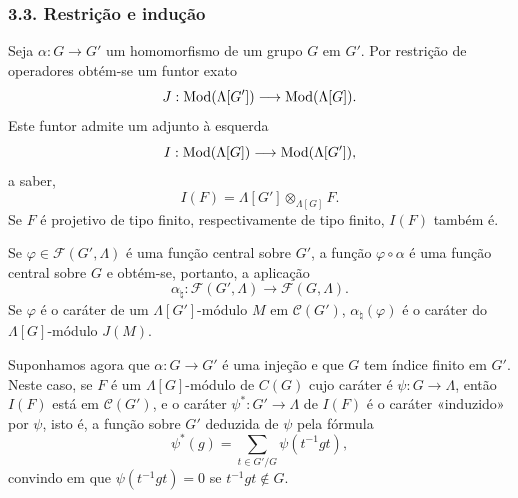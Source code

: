 \subsubsection*{3.3. Restrição e indução}

Seja $\alpha:G\to G'$ um homomorfismo de um grupo $G$ em $G'$. Por restrição de operadores obtém-se um funtor exato
\[
J:\operatorname{Mod}(\Lambda[G'])\longrightarrow\operatorname{Mod}(\Lambda[G]).
\]
Este funtor admite um adjunto à esquerda
\[
I:\operatorname{Mod}(\Lambda[G])\longrightarrow\operatorname{Mod}(\Lambda[G']),
\]
a saber,
\[
I(F)=\Lambda[G']\otimes_{\Lambda[G]}F.
\]
Se $F$ é projetivo de tipo finito, respectivamente de tipo finito, $I(F)$ também é.

Se $\varphi\in\mathcal F(G',\Lambda)$ é uma função central sobre $G'$, a função $\varphi\circ\alpha$ é uma função central sobre $G$ e obtém-se, portanto, a aplicação
\[
\alpha_\natural: \mathcal F(G',\Lambda)\longrightarrow\mathcal F(G,\Lambda).
\]
Se $\varphi$ é o caráter de um $\Lambda[G']$-módulo $M$ em $\mathcal C(G')$, $\alpha_\natural(\varphi)$ é o caráter do $\Lambda[G]$-módulo $J(M)$.

Suponhamos agora que $\alpha:G\to G'$ é uma injeção e que $G$ tem índice finito em $G'$. Neste caso, se $F$ é um $\Lambda[G]$-módulo de $C(G)$ cujo caráter é $\psi:G\to\Lambda$, então $I(F)$ está em $\mathcal C(G')$, e o caráter $\psi^*:G'\to\Lambda$ de $I(F)$ é o caráter «induzido» por $\psi$, isto é, a função sobre $G'$ deduzida de $\psi$ pela fórmula
\[
\psi^*(g)=\sum_{t\in G'/G}\psi(t^{-1}gt),
\tag{3.3.1}
\]
convindo em que $\psi(t^{-1}gt)=0$ se $t^{-1}gt\notin G$.
